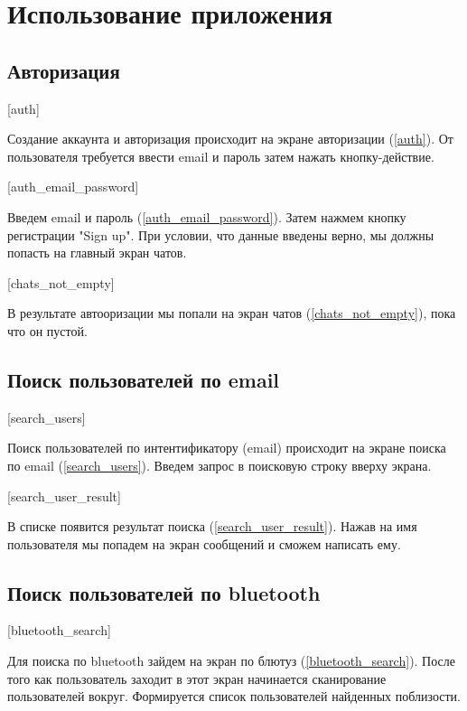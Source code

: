 \documentclass[opermanual]{espd}
\begin{document}
\section{Использование приложения}

\subsection{Авторизация}

[auth]

Создание аккаунта и авторизация происходит на экране авторизации (\ref{auth}).
От пользователя требуется ввести email и пароль затем нажать кнопку-действие.

[auth_email_password]

Введем email и пароль (\ref{auth_email_password}). Затем нажмем кнопку регистрации "Sign up". При условии, что данные введены верно, мы должны попасть на главный экран чатов.

[chats_not_empty]

В результате автооризации мы попали на экран чатов (\ref{chats_not_empty}), пока что он пустой.

\subsection{Поиск пользователей по email}

[search_users]

Поиск пользователей по интентификатору (email) происходит на экране поиска по email (\ref{search_users}). Введем запрос в поисковую строку вверху экрана.

[search_user_result]

В списке появится результат поиска (\ref{search_user_result}). Нажав на имя пользователя мы попадем на экран сообщений и сможем написать ему.

\subsection{Поиск пользователей по bluetooth}

[bluetooth_search]

Для поиска по bluetooth зайдем на экран по блютуз (\ref{bluetooth_search}). После того как пользователь заходит в этот экран начинается сканирование пользователей вокруг. Формируется список пользователей найденных поблизости.
\end{document}
